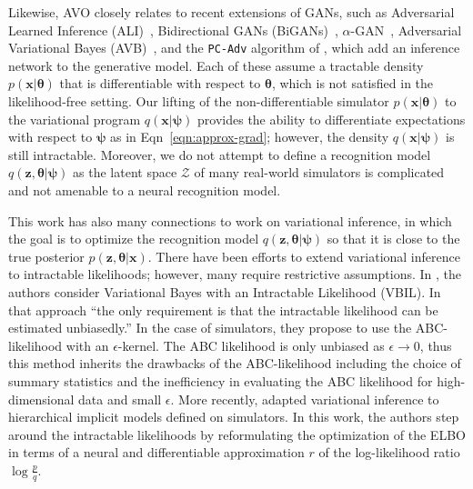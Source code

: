 \documentclass{article}
\newcommand{\bftheta}{{\bm \theta}}
\newcommand{\bfpsi}{{\bm \psi}}
\newcommand{\bfx}{\mathbf{x}}
\newcommand{\bfz}{\mathbf{z}}
\theoremstyle{plain}
\begin{document}
Likewise, AVO closely relates to recent extensions of GANs, such as
Adversarial Learned Inference (ALI)~\cite{dumoulin2016adversarially},
Bidirectional GANs (BiGANs)~\cite{donahue2016adversarial},
$\alpha$-GAN~\cite{rosca2017variational}, Adversarial Variational Bayes
(AVB)~\cite{DBLP:journals/corr/MeschederNG17}, and the \texttt{PC-Adv}
algorithm of  \cite{2017arXiv170208235H}, which
add an inference network to the generative model.  Each of these assume a
tractable density $p(\bfx|\bftheta)$ that is differentiable with respect to
$\bftheta$, which is  not satisfied in the likelihood-free setting. Our lifting
of the non-differentiable simulator $p(\bfx|\bftheta)$ to the variational
program $q(\bfx | \bfpsi)$ provides the ability to differentiate expectations
with respect to $\bfpsi$ as in Eqn~\ref{eqn:approx-grad}; however, the density
$q(\bfx | \bfpsi)$ is still intractable. Moreover, we do not attempt to define a
recognition model  $q(\bfz, \bftheta|\bfpsi)$ as the latent space $\mathcal{Z}$
of many real-world simulators is complicated and not amenable to a neural
recognition model.

This work has also many connections to work on variational inference, in which
the goal is to optimize the recognition model $q(\bfz, \bftheta|\bfpsi)$ so that
it is close to the true posterior $p(\bfz, \bftheta |\mathbf{x})$. There have
been efforts to extend variational inference to intractable likelihoods;
however, many require restrictive assumptions.  In \cite{tran2017variational},
the authors consider Variational Bayes with an Intractable Likelihood (VBIL). In
that approach ``the only requirement is that the intractable likelihood can be
estimated unbiasedly.'' In the case of simulators, they propose to use the
ABC-likelihood with an $\epsilon$-kernel. The ABC likelihood is only unbiased as
$\epsilon \to 0$,   thus this method inherits the drawbacks of the
ABC-likelihood including the choice of summary statistics and the inefficiency
in evaluating the ABC likelihood for high-dimensional data and small $\epsilon$.
More recently, \cite{2017arXiv170208896T} adapted variational inference to
hierarchical implicit models defined on simulators. In this work, the authors
step around the intractable likelihoods by reformulating the optimization of the
ELBO in terms of a neural and differentiable approximation $r$ of the log-likelihood
ratio $\log \tfrac{p}{q}$.
\end{document}
